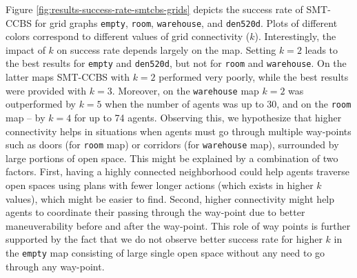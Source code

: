 \documentclass[review]{elsarticle}
\newcommand{\smtccbs}{SMT-CCBS\xspace}
\begin{document}
Figure \ref{fig:results-success-rate-smtcbs-grids} depicts the success rate of \smtccbs for grid graphs \texttt{empty}, \texttt{room}, \texttt{warehouse}, and \texttt{den520d}. 
Plots of different colors correspond to different values of grid connectivity ($k$). Interestingly, the impact of $k$ on success rate depends largely on the map. Setting $k=2$ leads to the best results for \texttt{empty} and \texttt{den520d}, but not for \texttt{room} and \texttt{warehouse}. On the latter maps \smtccbs with $k=2$ performed very poorly, while the best results were provided with $k=3$. Moreover, on the \texttt{warehouse} map $k=2$ was outperformed by $k=5$ when the number of agents was up to 30, and on the \texttt{room} map -- by $k=4$ for up to 74 agents. Observing this, we hypothesize that higher connectivity helps in situations when agents must go through multiple way-points such as doors (for \texttt{room} map) or corridors (for \texttt{warehouse} map), surrounded by large portions of open space. This might be explained by a combination of two factors. First, having a highly connected neighborhood could help agents traverse open spaces using plans with fewer longer actions (which exists in higher $k$ values), which might be easier to find. Second, higher connectivity might help agents to coordinate their passing through the way-point due to better maneuverability before and after the way-point. This role of way points is further supported by the fact that we do not observe better success rate for higher $k$ in the \texttt{empty} map consisting of large single open space without any need to go through any way-point.
\end{document}

